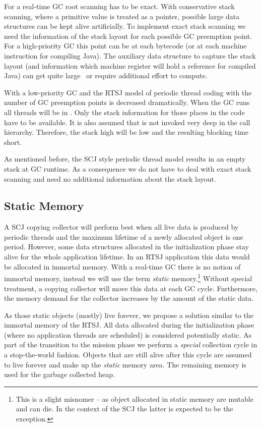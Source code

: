 For a real-time GC root scanning has to be exact. With conservative
stack scanning, where a primitive value is treated as a pointer,
possible large data structures can be kept alive artificially. To
implement exact stack scanning we need the information of the stack
layout for each possible GC preemption point. For a high-priority GC
this point can be at each bytecode (or at each machine instruction
for compiling Java). The auxiliary data structure to capture the
stack layout (and information which machine register will hold a
reference for compiled Java) can get quite large~\cite{jop:gcroots}
or require additional effort to compute.

With a low-priority GC and the RTSJ model of periodic thread coding
with  the number of GC preemption points is decreased
dramatically. When the GC runs all threads will be in .
Only the stack information for those places in the code have to be
available. It is also assumed that  is not invoked very
deep in the call hierarchy. Therefore, the stack high will be low
and the resulting blocking time short.

As mentioned before, the SCJ style periodic thread model results in
an empty stack at GC runtime. As a consequence we do not have to
deal with exact stack scanning and need no additional information
about the stack layout.

\subsection{Static Memory} \label{sec:static:mem}

A SCJ copying collector will perform best when all live data is
produced by periodic threads and the maximum lifetime of a newly
allocated object is one period.  However, some data structures
allocated in the initialization phase stay alive for the whole
application lifetime.  In an RTSJ application this data would be
allocated in immortal memory.  With a real-time GC there is no notion
of {immortal} memory, instead we will use the term \emph{static}
memory.\footnote{This is a slight misnomer -- as object allocated in
static memory are mutable and can die. In the context of the SCJ the
latter is expected to be the exception.} Without special treatment, a
copying collector will move this data at each GC cycle. Furthermore,
the memory demand for the collector increases by the amount of the
static data.

As those static objects (mostly) live {forever}, we propose a solution
similar to the immortal memory of the RTSJ.  All data allocated during the
initialization phase (where no application threads are scheduled) is
considered potentially static. As part of the transition to the mission
phase we perform a \emph{special} collection cycle in a stop-the-world
fashion. Objects that are still alive after this cycle are assumed to live
forever and make up the \emph{static} memory area. The remaining memory is
used for the garbage collected heap.

